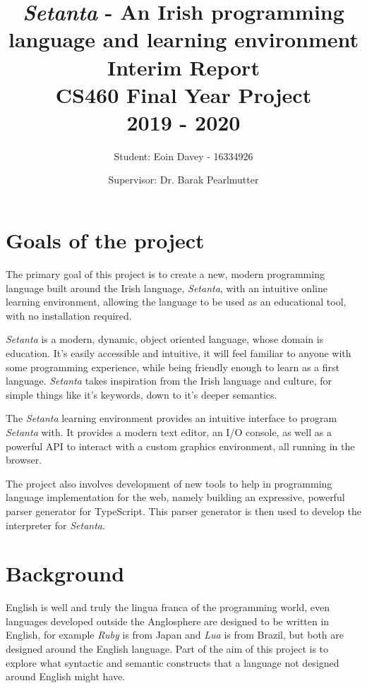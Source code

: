 \documentclass[11pt]{extarticle}
\newcommand{\Setanta}{\emph{Setanta}}
\begin{document}
    \title{
    \huge \Setanta{} - An Irish programming language and learning environment\\
    \Large Interim Report\\
    \large CS460 Final Year Project\\
    2019 - 2020}
    \author{\Large Student: Eoin Davey - 16334926 \and Supervisor: Dr. Barak Pearlmutter}
    \maketitle
    \section*{Goals of the project}

    The primary goal of this project is to create a new, modern programming language built around the Irish language, \Setanta{}, with an intuitive online learning environment, allowing the language to be used as an educational tool, with no installation required.

    \Setanta{} is a modern, dynamic, object oriented language, whose domain is education. It's easily accessible and intuitive, it will feel familiar to anyone with some programming experience, while being friendly enough to learn as a first language. \Setanta{} takes inspiration from the Irish language and culture, for simple things like it's keywords, down to it's deeper semantics.

    The \Setanta{} learning environment provides an intuitive interface to program \Setanta{} with. It provides a modern text editor, an I/O console, as well as a powerful API to interact with a custom graphics environment, all running in the browser.

    The project also involves development of new tools to help in programming language implementation for the web, namely building an expressive, powerful parser generator for TypeScript. This parser generator is then used to develop the interpreter for \Setanta{}.

    \section*{Background}

    English is well and truly the lingua franca of the programming world, even languages developed outside the Anglosphere are designed to be written in English, for example \emph{Ruby} is from Japan and \emph{Lua} is from Brazil, but both are designed around the English language. Part of the aim of this project is to explore what syntactic and semantic constructs that a language not designed around English might have.
\end{document}
